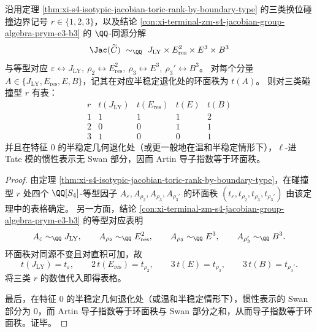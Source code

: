 \begin{theorem}\label{thm:xi-terminal-zm-s4-langlands-factor-torus-rank-conductor-table}
沿用定理 \ref{thm:xi-s4-isotypic-jacobian-toric-rank-by-boundary-type} 的三类换位碰撞边界记号 \(r\in\{1,2,3\}\)，以及结论 \ref{con:xi-terminal-zm-s4-jacobian-group-algebra-prym-e3-b3} 的 \(\QQ\)-同源分解
\[
\Jac(\widetilde C)\ \sim_{\QQ}\ J_{\mathrm{LY}}\times E_{\mathrm{res}}^2\times E^3\times B^3
\]
与等型对应
\(
\varepsilon\leftrightarrow J_{\mathrm{LY}},\
\rho_2\leftrightarrow E_{\mathrm{res}}^2,\
\rho_3\leftrightarrow E^3,\
\rho_3'\leftrightarrow B^3
\)。
对每个分量 \(A\in\{J_{\mathrm{LY}},E_{\mathrm{res}},E,B\}\)，记其在对应半稳定退化处的环面秩为 \(t(A)\)。
则对三类碰撞型 \(r\) 有表：
\[
\begin{array}{c|cccc}
r & t(J_{\mathrm{LY}}) & t(E_{\mathrm{res}}) & t(E) & t(B)\\
\hline
1 & 1 & 1 & 1 & 2\\
2 & 0 & 0 & 1 & 1\\
3 & 1 & 0 & 0 & 1
\end{array}
\]
并且在特征 \(0\) 的半稳定几何退化处（或更一般地在温和半稳定情形下），\(\ell\)-进 Tate 模的惯性表示无 Swan 部分，因而 Artin 导子指数等于环面秩。
\end{theorem}
\begin{proof}
由定理 \ref{thm:xi-s4-isotypic-jacobian-toric-rank-by-boundary-type}，在碰撞型 \(r\) 处四个 \(\QQ[S_4]\)-等型因子 \(A_\varepsilon,A_{\rho_2},A_{\rho_3},A_{\rho_3'}\) 的环面秩
\((t_\varepsilon,t_{\rho_2},t_{\rho_3},t_{\rho_3'})\)
由该定理中的表格确定。
另一方面，结论 \ref{con:xi-terminal-zm-s4-jacobian-group-algebra-prym-e3-b3} 的等型对应表明
\[
A_\varepsilon\sim_{\QQ} J_{\mathrm{LY}},\qquad
A_{\rho_2}\sim_{\QQ}E_{\mathrm{res}}^2,\qquad
A_{\rho_3}\sim_{\QQ}E^3,\qquad
A_{\rho_3'}\sim_{\QQ}B^3.
\]
环面秩对同源不变且对直积可加，故
\[
t(J_{\mathrm{LY}})=t_\varepsilon,\qquad
2\,t(E_{\mathrm{res}})=t_{\rho_2},\qquad
3\,t(E)=t_{\rho_3},\qquad
3\,t(B)=t_{\rho_3'}.
\]
将三类 \(r\) 的数值代入即得表格。
\par
最后，在特征 \(0\) 的半稳定几何退化处（或温和半稳定情形下），惯性表示的 Swan 部分为 \(0\)，而 Artin 导子指数等于环面秩与 Swan 部分之和，从而导子指数等于环面秩。证毕。
\end{proof}

